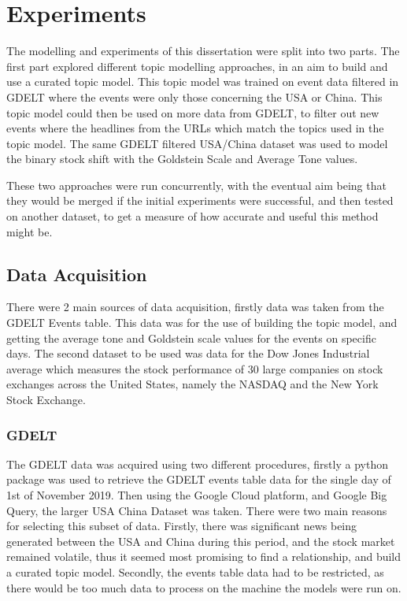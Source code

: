 \section{Experiments}
\label{experiments}
The modelling and experiments of this dissertation were split into two parts. The first part explored different topic modelling approaches, in an aim to build and use a curated topic model. This topic model was trained on event data filtered in GDELT where the events were only those concerning the USA or China. This topic model could then be used on more data from GDELT, to filter out new events where the headlines from the URLs which match the topics used in the topic model. The same GDELT filtered USA/China dataset was used to model the binary stock shift with the Goldstein Scale and Average Tone values. 

These two approaches were run concurrently, with the eventual aim being that they would be merged if the initial experiments were successful, and then tested on another dataset, to get a measure of how accurate and useful this method might be. 

\subsection{Data Acquisition}
There were 2 main sources of data acquisition, firstly data was taken from the GDELT Events table. This data was for the use of building the topic model, and getting the average tone and Goldstein scale values for the events on specific days. The second dataset to be used was data for the Dow Jones Industrial average which measures the stock performance of 30 large companies on stock exchanges across the United States, namely the NASDAQ and the New York Stock Exchange.

\subsubsection{GDELT}
The GDELT data was acquired using two different procedures, firstly a python package was used to retrieve the GDELT events table data for the single day of 1st of November 2019. Then using the Google Cloud platform, and Google Big Query, the larger USA China Dataset was taken. There were two main reasons for selecting this subset of data. Firstly, there was significant news being generated between the USA and China during this period, and the stock market remained volatile, thus it seemed most promising to find a relationship, and build a curated topic model. Secondly, the events table data had to be restricted, as there would be too much data to process on the machine the models were run on. 

